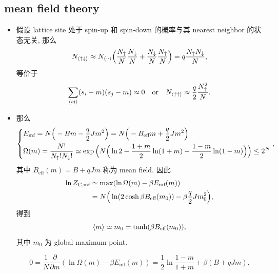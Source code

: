 \subsection{mean field theory}
\begin{itemize}
	\item 假设 lattice site 处于 spin-up 和 spin-down 的概率与其 nearest neighbor 的状态无关, 那么
	\begin{equation}
		N_{\braket{\uparrow \downarrow}} \approx N_{\braket{\cdot \cdot}} \Big( \frac{N_\uparrow}{N} \frac{N_\downarrow}{N} + \frac{N_\downarrow}{N} \frac{N_\uparrow}{N} \Big) = q \frac{N_\uparrow N_\downarrow}{N},
	\end{equation}
	等价于
	\begin{equation}
		\sum_{\braket{i j}} (s_i - m) (s_j - m) \approx 0 \quad \text{or} \quad N_{\braket{\uparrow \uparrow}} \approx \frac{q}{2} \frac{N_\uparrow^2}{N}.
	\end{equation}
	
	\item 那么
	\begin{equation}
		\begin{dcases}
			E_\text{mf} = N \Big( - B m - \frac{q}{2} J m^2 \Big) = N \Big( - B_\text{eff} m + \frac{q}{2} J m^2 \Big) \\
			\Omega(m) = \frac{N!}{N_\uparrow! N_\downarrow!} \simeq \exp \Big( N \Big( \ln 2 - \frac{1 + m}{2} \ln(1 + m) - \frac{1 - m}{2} \ln(1 - m) \Big) \Big) \leq 2^N
		\end{dcases},
	\end{equation}
	其中 $B_\text{eff}(m) = B + q J m$ 称为 mean field. 因此
	\begin{align}
		\ln Z_\text{C,mf} &\simeq \max(\ln \Omega(m) - \beta E_\text{mf}(m)) \notag \\
		&= N \Big( \ln(2 \cosh \beta B_\text{eff}(m_0)) - \beta \frac{q}{2} J m_0^2 \Big),
	\end{align}
	得到
	\begin{equation}
		\braket{m} \simeq m_0 = \tanh(\beta B_\text{eff}(m_0)),
	\end{equation}
	其中 $m_0$ 为 global maximum point.
	
	\begin{tcolorbox}[title=calculation:]
		\begin{equation}
			0 = \frac{1}{N} \frac{\partial}{\partial m} (\ln \Omega(m) - \beta E_\text{mf}(m)) = \frac{1}{2} \ln \frac{1 - m}{1 + m} + \beta (B + q J m).
		\end{equation}
	\end{tcolorbox}
	

\end{itemize}
